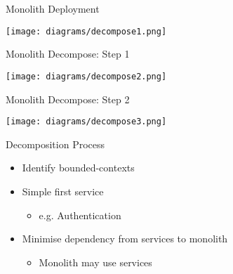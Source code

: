 \documentclass{slide}
\begin{document}
\begin{frame}{Monolith Deployment}
    \begin{adjustwidth}{-12mm}{-12mm}
        \centering
        \texttt{[image: diagrams/decompose1.png]}
    \end{adjustwidth}
\end{frame}

\begin{frame}{Monolith Decompose: Step 1}
    \begin{adjustwidth}{-12mm}{-12mm}
        \centering
        \texttt{[image: diagrams/decompose2.png]}
    \end{adjustwidth}
\end{frame}

\begin{frame}{Monolith Decompose: Step 2}
    \begin{adjustwidth}{-12mm}{-12mm}
        \centering
        \texttt{[image: diagrams/decompose3.png]}
    \end{adjustwidth}
\end{frame}

\begin{frame}{Decomposition Process}
\vspace{1pt}
{\huge
\begin{itemize}
    \item Identify bounded-contexts
    \vspace{1mm}
    \item Simple first service
    \begin{itemize}
        \LARGE\item e.g. Authentication
    \end{itemize}
    \vspace{1mm}
    \item Minimise dependency from services to monolith
    \begin{itemize}
        \LARGE\item Monolith may use services
    \end{itemize}
\end{itemize}
}
\end{frame}
\end{document}
